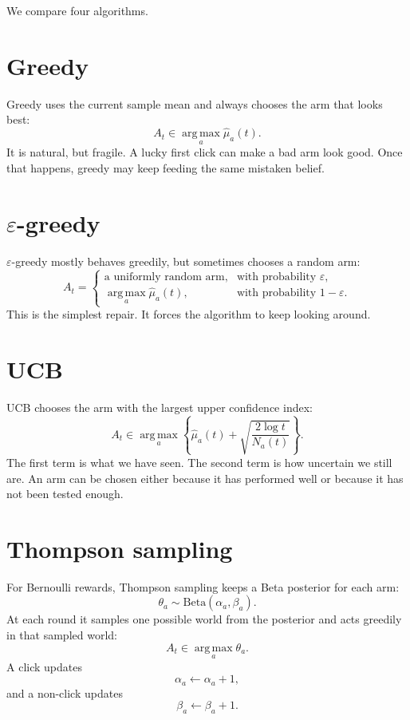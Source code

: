 \documentclass[en,nofont,11pt]{elegantbook}
\newcommand{\argmax}{\operatorname*{arg\,max}}
\begin{document}
We compare four algorithms.

\section{Greedy}

Greedy uses the current sample mean and always chooses the arm that looks best:
\[
A_t\in \argmax_a \widehat{\mu}_a(t).
\]
It is natural, but fragile.  A lucky first click can make a bad arm look good.  Once that happens, greedy may keep feeding the same mistaken belief.

\section{\texorpdfstring{$\varepsilon$}{epsilon}-greedy}

$\varepsilon$-greedy mostly behaves greedily, but sometimes chooses a random arm:
\[
A_t=
\begin{cases}
\text{a uniformly random arm}, & \text{with probability }\varepsilon,\\
\argmax_a \widehat{\mu}_a(t), & \text{with probability }1-\varepsilon.
\end{cases}
\]
This is the simplest repair.  It forces the algorithm to keep looking around.

\section{UCB}

UCB chooses the arm with the largest upper confidence index:
\[
A_t\in
\argmax_a
\left\{
\widehat{\mu}_a(t)
+
\sqrt{\frac{2\log t}{N_a(t)}}
\right\}.
\]
The first term is what we have seen.  The second term is how uncertain we still are.  An arm can be chosen either because it has performed well or because it has not been tested enough.

\section{Thompson sampling}

For Bernoulli rewards, Thompson sampling keeps a Beta posterior for each arm:
\[
\theta_a\sim \mathrm{Beta}(\alpha_a,\beta_a).
\]
At each round it samples one possible world from the posterior and acts greedily in that sampled world:
\[
A_t\in\argmax_a \theta_a.
\]
A click updates
\[
\alpha_a\leftarrow \alpha_a+1,
\]
and a non-click updates
\[
\beta_a\leftarrow \beta_a+1.
\]
\end{document}
